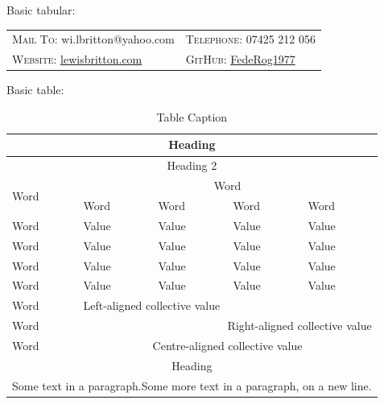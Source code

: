 \documentclass[11pt, english]{article}
\begin{document}
	\newpage

	Basic tabular:

	\begin{center}
                \small
        \begin{tabular}{p{5.45cm}|p{5.45cm}}
                \textsc{Mail To:} wi.lbritton@yahoo.com & \textsc{Telephone:} 07425 212 056\\
                \textsc{Website:} \href{http://lewisbritton.com}{lewisbritton.com} & \textsc{GitHub:} \href{https://github.com/FedeRog1977}{FedeRog1977}\\
        \end{tabular}
        \end{center}

	Basic table: 

	\begin{table}[h]
		\scriptsize
		\renewcommand{\arraystretch}{1.25}
	\begin{center}
	\begin{tabular}{p{3cm}|p{2cm}p{2cm}p{2cm}p{2cm}}
		\hline
		\hline
		\multicolumn{5}{c}{Heading}\\
		\hline
		\hline
		\multicolumn{5}{c}{Heading 2}\\
		\hline
		\multirow{2}{*}{Word} & \multicolumn{4}{c}{Word}\\
		\cline{2-5}
		& Word & Word & Word & Word\\
		\hline
		Word & Value & Value & Value & Value\\
                Word & Value & Value & Value & Value\\
                Word & Value & Value & Value & Value\\
                Word & Value & Value & Value & Value\\
		\hline
		Word & \multicolumn{4}{l}{Left-aligned collective value}\\
		Word & \multicolumn{4}{r}{Right-aligned collective value}\\
		Word & \multicolumn{4}{c}{Centre-aligned collective value}\\
		\hline
		\hline
		\multicolumn{5}{c}{Heading}\\
		\hline
		\hline
		\multicolumn{5}{p{11.5cm}}{Some text in a paragraph.\newline Some more text in a paragraph, on a new line.}\\
		\hline
	\end{tabular}
		\caption{Table Caption}
	\end{center}
	\end{table}
\end{document}
